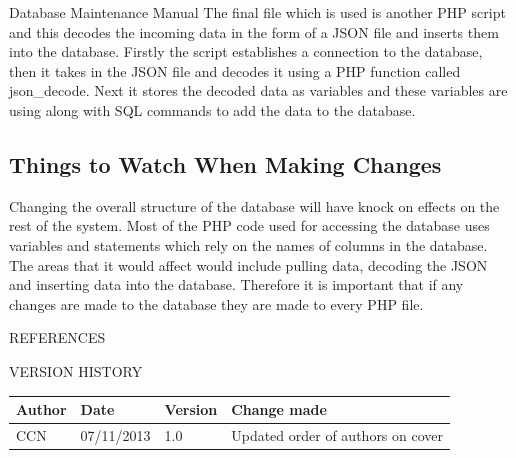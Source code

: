\documentclass{article}
\newcommand{\versionhistory}{
		\begin{tabularx}{\linewidth}{| p{2cm} | p{2cm} | p{2cm} | X | }
			\hline
			\bf{Author} & \bf{Date} & \bf{Version} & \bf{Change made} \\
			\hline
			CCN & 07/11/2013 & 1.0 & Updated order of authors on cover \\
			\hline
		\end{tabularx}
}
\begin{document}
\begin{section}{Database Maintenance Manual}
		The final file which is used is another PHP script and this decodes the incoming data in the form of a JSON file and inserts them into the database. Firstly the script establishes a connection to the database, then it takes in the JSON file and decodes it using a PHP function called json\_decode. Next it stores the decoded data as variables and these variables are using along with SQL commands to add the data to the database.

		\subsection{Things to Watch When Making Changes}
		Changing the overall structure of the database will have knock on effects on the rest of the system. Most of the PHP code used for accessing the database uses variables and statements which rely on the names of columns in the database. The areas that it would affect would include pulling data, decoding the JSON and inserting data into the database. Therefore it is important that if any changes are made to the database they are made to every PHP file.
	\end{section}
	
	\nocite{LaTeXTemplate} %

	\newpage
	\begin{section}{REFERENCES}
		
		
	\end{section}
	
	\vspace{1cm}
	\begin{section}{VERSION HISTORY}
		\versionhistory
	\end{section}
\end{document}
